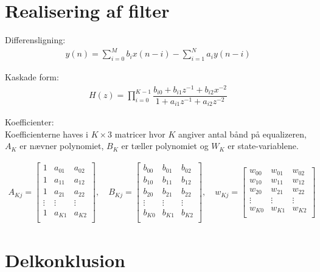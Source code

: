 \section{Realisering af filter}

    Differensligning:
    \begin{align}
    y(n) = \sum\limits_{i=0}^{M} b_i x(n-i) - \sum\limits_{i=1}^N a_i y(n-i)
    \end{align}


   

Kaskade form:\\

    
   \begin{align}
   H(z) = \prod\limits_{i=0}^{K-1} \dfrac{b_{i0} + b_{i1} z^{-1} + b_{i2} x^{-2}}{1 + a_{i1} z^{-1} + a_{i2} z^{-2}} 
   \end{align}


   Koefficienter:\\
   Koefficienterne haves i $K \times 3$ matricer hvor $K$ angiver antal bånd på equalizeren,
    $A_K$ er nævner polynomiet, $B_K$ er tæller polynomiet
   og $W_K$ er state-variablene.  


   \begin{align}
   A_{Kj} = \left[\begin{matrix}
   1 			& a_{01} 	& a_{02} \\
   1 			& a_{11} 	& a_{12} \\
   1 			& a_{21} 	& a_{22} \\
   \vdots 		& \vdots 	&  \vdots \\
   1 			& a_{K1} 	& a_{K2} \\
   \end{matrix}
   \right], \quad
      B_{Kj} = \left[\begin{matrix}
   b_{00}		& b_{01} 	& b_{02} \\
   b_{10}		& b_{11} 	& b_{12} \\
   b_{20}		& b_{21} 	& b_{22} \\
   \vdots 		& \vdots 	&  \vdots \\
   b_{K0}		& b_{K1} 	& b_{K2} \\
   \end{matrix}
   \right], \quad
      w_{Kj} = \left[\begin{matrix}
   w_{00}		& w_{01} 	& w_{02} \\
   w_{10}		& w_{11} 	& w_{12} \\
   w_{20}		& w_{21} 	& w_{22} \\
   \vdots 		& \vdots 	&  \vdots \\
   w_{K0}		& w_{K1} 	& w_{K2} \\
   \end{matrix}
   \right]
   \end{align}
\section{Delkonklusion}

